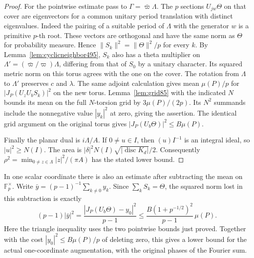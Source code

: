 \documentclass[a4paper,11pt]{article}
\theoremstyle{definition}
\theoremstyle{remark}
\numberwithin{equation}{section}
\begin{document}
\begin{proof}
For the pointwise estimate pass to
\(\Gamma=\bar\varpi\Lambda\). The \(p\) sections \(U_{jw}\Theta\)
on that cover are eigenvectors for a common unitary period
translation with distinct eigenvalues. Indeed the pairing of a
suitable period of \(\Lambda\) with the generator \(w\) is a
primitive \(p\)-th root. These vectors are orthogonal and have
the same norm as \(\Theta\) for probability measure. Hence
\(\|S_k\|^2=\|\Theta\|^2/p\) for every \(k\). By
Lemma~\ref{lem:cyclicneighbor495}, \(S_k\) also has a theta
multiplier on \(\Lambda'=(\bar\varpi/\varpi)\Lambda\), differing
from that of \(S_0\) by a unitary character. Its squared metric
norm on this torus agrees with the one on the cover. The rotation
from \(\Lambda\) to \(\Lambda'\) preserves \(c\) and \(\lambda\).
The same adjoint calculation gives mean \(\mu(P)/p\) for
\(|J_P(U_zU_b S_k)|^2\) on the new torus. Lemma~\ref{lem:grid85}
with the indicated \(N\) bounds its mean on the full \(N\)-torsion
grid by \(3\mu(P)/(2p)\). Its \(N^2\) summands include the
nonnegative value \(|y_k|^2\) at zero, giving the assertion.
The identical grid argument on the original torus gives
\(|J_P(U_b\Theta)|^2\le B\mu(P)\).

Finally the planar dual is \(i\Lambda/A\). If \(0\ne u\in I\),
then \((u)I^{-1}\) is an integral ideal, so \(|u|^2\ge N(I)\).
The area is \(|\delta|^2 N(I)\sqrt{|\operatorname{disc}K_d|}/2\).
Consequently \(\rho^2=\min_{0\ne z\in\Lambda}|z|^2/(\pi A)\)
has the stated lower bound.
\end{proof}

In one scalar coordinate there is also an estimate after subtracting
the mean on \(\mathbb F_p^\times\). Write
\(\bar y=(p-1)^{-1}\sum_{k\ne0}y_k\). Since \(\sum_k S_k=\Theta\),
the squared norm lost in this subtraction is exactly
\[
 (p-1)|\bar y|^2=\frac{|J_P(U_b\Theta)-y_0|^2}{p-1}
 \le \frac{B(1+p^{-1/2})^2}{p-1}\,\mu(P).
\]
Here the triangle inequality uses the two pointwise bounds just
proved. Together with the cost \(|y_0|^2\le B\mu(P)/p\) of deleting
zero, this gives a lower bound for the actual one-coordinate
augmentation, with the original phases of the Fourier sum.
\end{document}
